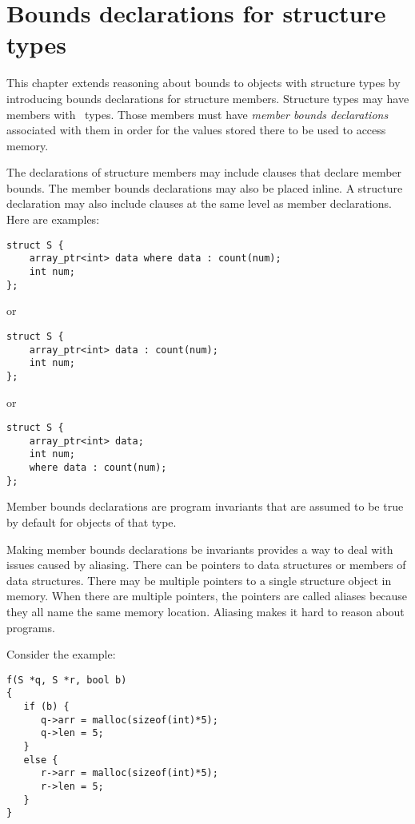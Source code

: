 
\chapter{Bounds declarations for structure types}
\label{chapter:structure-bounds}

This chapter extends reasoning about bounds to objects with structure
types by introducing bounds declarations for structure members.
Structure types may have members with \arrayptr\ types. Those
members must have \emph{member bounds declarations} associated with them in order for
the values stored there to be used to access memory.

The declarations of
structure members may include  clauses that declare member
bounds. The member bounds declarations may also be placed inline.
A structure declaration may also include  clauses at the same
level as member declarations.  Here are examples:

\begin{lstlisting}
struct S {
    array_ptr<int> data where data : count(num);
    int num;
};
\end{lstlisting}
or
\begin{lstlisting}
struct S {
    array_ptr<int> data : count(num);
    int num;
};
\end{lstlisting}
or
\begin{lstlisting}
struct S {
    array_ptr<int> data;
    int num;
    where data : count(num);
};
\end{lstlisting}

Member bounds declarations are program invariants that are assumed to be true
by default for objects of that type.   

Making member bounds declarations be invariants provides a way to deal with issues
caused by aliasing. There can be pointers to data structures or members
of data structures. There may be multiple pointers to a single
structure object in memory. When there are multiple pointers,
the pointers are called aliases because they all name the same
memory location.  Aliasing makes it hard to reason about programs.

Consider the example:
\begin{lstlisting}
f(S *q, S *r, bool b)
{
   if (b) {
      q->arr = malloc(sizeof(int)*5);
      q->len = 5;
   }
   else {
      r->arr = malloc(sizeof(int)*5);
      r->len = 5;
   }
}
\end{lstlisting}

